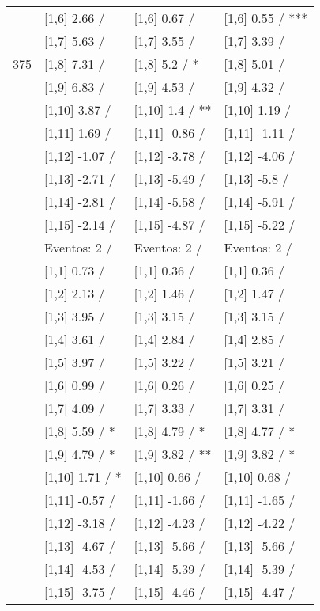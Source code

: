 \begin{table}
\begin{tabular}[t]{llll}
 & {}[1,6] 2.66  / & {}[1,6] 0.67  / & {}[1,6] 0.55  / ***\\
 & {}[1,7] 5.63  / & {}[1,7] 3.55  / & {}[1,7] 3.39  /\\
375 & {}[1,8] 7.31  / & {}[1,8] 5.2  / * & {}[1,8] 5.01  /\\
\addlinespace
 & {}[1,9] 6.83  / & {}[1,9] 4.53  / & {}[1,9] 4.32  /\\
 & {}[1,10] 3.87  / & {}[1,10] 1.4  / ** & {}[1,10] 1.19  /\\
 & {}[1,11] 1.69  / & {}[1,11] -0.86  / & {}[1,11] -1.11  /\\
 & {}[1,12] -1.07  / & {}[1,12] -3.78  / & {}[1,12] -4.06  /\\
 & {}[1,13] -2.71  / & {}[1,13] -5.49  / & {}[1,13] -5.8  /\\
\addlinespace
 & {}[1,14] -2.81  / & {}[1,14] -5.58  / & {}[1,14] -5.91  /\\
 & {}[1,15] -2.14  / & {}[1,15] -4.87  / & {}[1,15] -5.22  /\\
 & Eventos:  2 / & Eventos:  2 / & Eventos:  2 /\\
 & {}[1,1] 0.73  / & {}[1,1] 0.36  / & {}[1,1] 0.36  /\\
 & {}[1,2] 2.13  / & {}[1,2] 1.46  / & {}[1,2] 1.47  /\\
\addlinespace
 & {}[1,3] 3.95  / & {}[1,3] 3.15  / & {}[1,3] 3.15  /\\
 & {}[1,4] 3.61  / & {}[1,4] 2.84  / & {}[1,4] 2.85  /\\
 & {}[1,5] 3.97  / & {}[1,5] 3.22  / & {}[1,5] 3.21  /\\
 & {}[1,6] 0.99  / & {}[1,6] 0.26  / & {}[1,6] 0.25  /\\
 & {}[1,7] 4.09  / & {}[1,7] 3.33  / & {}[1,7] 3.31  /\\
\addlinespace
500 & {}[1,8] 5.59  / * & {}[1,8] 4.79  / * & {}[1,8] 4.77  / *\\
 & {}[1,9] 4.79  / * & {}[1,9] 3.82  / ** & {}[1,9] 3.82  / *\\
 & {}[1,10] 1.71  / * & {}[1,10] 0.66  / & {}[1,10] 0.68  /\\
 & {}[1,11] -0.57  / & {}[1,11] -1.66  / & {}[1,11] -1.65  /\\
 & {}[1,12] -3.18  / & {}[1,12] -4.23  / & {}[1,12] -4.22  /\\
\addlinespace
 & {}[1,13] -4.67  / & {}[1,13] -5.66  / & {}[1,13] -5.66  /\\
 & {}[1,14] -4.53  / & {}[1,14] -5.39  / & {}[1,14] -5.39  /\\
 & {}[1,15] -3.75  / & {}[1,15] -4.46  / & {}[1,15] -4.47  /\\
\bottomrule
\end{tabular}
\end{table}
